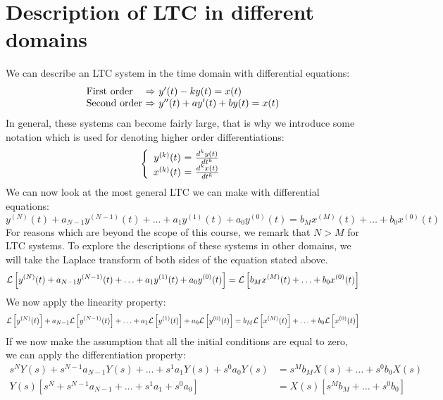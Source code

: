 \documentclass[]{subfiles}
\begin{document}
	\section{Description of LTC in different domains}
	We can describe an LTC system  in the time domain with differential equations:
	\begin{equation*}
		 \begin{array}{l@{\text{ $\Rightarrow$ }}l}
			\text{First order}& y'(t)-ky(t)=x(t)\\
			\text{Second order}&y''(t)+ay'(t)+by(t)=x(t)
		\end{array}
	\end{equation*}
	In general, these systems can become fairly large, that is why we introduce some notation which is used for denoting higher order differentiations: 
	\begin{equation*}
		\left\{ \begin{array}{r@{\text{ $=$ }}l}
			y^{(k)}(t)& \frac{d^ky(t)}{dt^k} \\
			x^{(k)}(t)& \frac{d^kx(t)}{dt^k}
		\end{array}\right.
	\end{equation*}
	We can now look at the most general LTC we can make with differential equations:
	\begin{equation*}
		y^{(N)}(t)+a_{N-1}y^{(N-1)}(t)+\ldots+a_1y^{(1)}(t)+a_0y^{(0)}(t)=b_Mx^{(M)}(t)+\ldots+b_0x^{(0)}(t)
	\end{equation*}
	For reasons which are beyond the scope of this course, we remark that $N > M$ for LTC systems. To explore the descriptions of these systems in other domains, we will take the Laplace transform of both sides of the equation stated above.
	\begin{equation*}
		\mathcal{L} \left[ y^{(N)}(t)+a_{N-1}y^{(N-1)}(t)+\ldots+a_1y^{(1)}(t)+a_0y^{(0)}(t)\right]  =\mathcal{L} \left[ b_Mx^{(M)}(t)+\ldots+b_0x^{(0)}(t)\right] 
	\end{equation*}
	We now apply the linearity property:
	\begin{equation*}
		\mathcal{L} \left[ y^{(N)}(t)\right] +a_{N-1}\mathcal{L}\left[ y^{(N-1)}(t)\right] +\ldots+a_1\mathcal{L}\left[ y^{(1)}(t)\right] +a_0\mathcal{L}\left[ y^{(0)}(t)\right]  =b_M\mathcal{L} \left[ x^{(M)}(t)\right] +\ldots+b_0\mathcal{L}\left[ x^{(0)}(t)\right] 
	\end{equation*}
	If we now make the assumption that all the initial conditions are equal to zero, we can apply the differentiation property:
	\begin{align*}
		s^NY(s)+s^{N-1}a_{N-1}Y(s)+\ldots+s^1a_1Y(s)+s^0a_0Y(s)&=s^Mb_MX(s)+\ldots+s^0b_0X(s)\\
		Y(s)\left[ s^N+s^{N-1}a_{N-1}+\ldots+s^1a_1+s^0a_0\right] &=X(s)\left[ s^Mb_M+\ldots+s^0b_0\right] 
	\end{align*}
\end{document}
